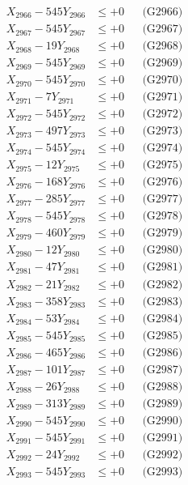 \documentclass[a4paper,10pt]{article}
\begin{document}
{\begin{align}
X_{2966} - 545Y_{2966} &\leq +0 && \text{(G2966)} \\
X_{2967} - 545Y_{2967} &\leq +0 && \text{(G2967)} \\
X_{2968} - 19Y_{2968} &\leq +0 && \text{(G2968)} \\
X_{2969} - 545Y_{2969} &\leq +0 && \text{(G2969)} \\
X_{2970} - 545Y_{2970} &\leq +0 && \text{(G2970)} \\
\allowbreak
X_{2971} - 7Y_{2971} &\leq +0 && \text{(G2971)} \\
X_{2972} - 545Y_{2972} &\leq +0 && \text{(G2972)} \\
X_{2973} - 497Y_{2973} &\leq +0 && \text{(G2973)} \\
X_{2974} - 545Y_{2974} &\leq +0 && \text{(G2974)} \\
X_{2975} - 12Y_{2975} &\leq +0 && \text{(G2975)} \\
X_{2976} - 168Y_{2976} &\leq +0 && \text{(G2976)} \\
X_{2977} - 285Y_{2977} &\leq +0 && \text{(G2977)} \\
X_{2978} - 545Y_{2978} &\leq +0 && \text{(G2978)} \\
X_{2979} - 460Y_{2979} &\leq +0 && \text{(G2979)} \\
X_{2980} - 12Y_{2980} &\leq +0 && \text{(G2980)} \\
\allowbreak
X_{2981} - 47Y_{2981} &\leq +0 && \text{(G2981)} \\
X_{2982} - 21Y_{2982} &\leq +0 && \text{(G2982)} \\
X_{2983} - 358Y_{2983} &\leq +0 && \text{(G2983)} \\
X_{2984} - 53Y_{2984} &\leq +0 && \text{(G2984)} \\
X_{2985} - 545Y_{2985} &\leq +0 && \text{(G2985)} \\
X_{2986} - 465Y_{2986} &\leq +0 && \text{(G2986)} \\
X_{2987} - 101Y_{2987} &\leq +0 && \text{(G2987)} \\
X_{2988} - 26Y_{2988} &\leq +0 && \text{(G2988)} \\
X_{2989} - 313Y_{2989} &\leq +0 && \text{(G2989)} \\
X_{2990} - 545Y_{2990} &\leq +0 && \text{(G2990)} \\
\allowbreak
X_{2991} - 545Y_{2991} &\leq +0 && \text{(G2991)} \\
X_{2992} - 24Y_{2992} &\leq +0 && \text{(G2992)} \\
X_{2993} - 545Y_{2993} &\leq +0 && \text{(G2993)} \\

\end{align}}
\end{document}
